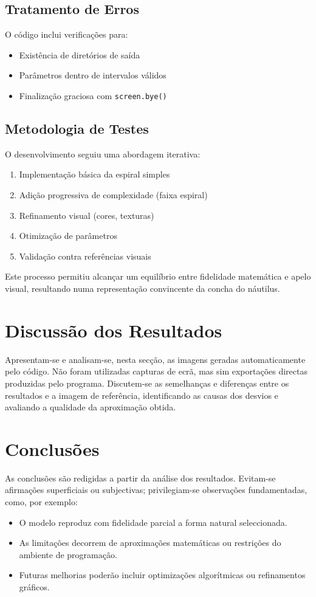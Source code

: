 \documentclass[12pt,a4paper,oneside]{extarticle}
\begin{document}
\subsection{Tratamento de Erros}
O código inclui verificações para:

\begin{itemize}
    \item Existência de diretórios de saída
    \item Parâmetros dentro de intervalos válidos
    \item Finalização graciosa com \texttt{screen.bye()}
\end{itemize}

\subsection{Metodologia de Testes}
O desenvolvimento seguiu uma abordagem iterativa:

\begin{enumerate}
    \item Implementação básica da espiral simples
    \item Adição progressiva de complexidade (faixa espiral)
    \item Refinamento visual (cores, texturas)
    \item Otimização de parâmetros
    \item Validação contra referências visuais
\end{enumerate}

Este processo permitiu alcançar um equilíbrio entre fidelidade matemática e apelo visual, resultando numa representação convincente da concha do náutilus.






\section{Discussão dos Resultados}
Apresentam-se e analisam-se, nesta secção, as imagens geradas automaticamente pelo código.  
Não foram utilizadas capturas de ecrã, mas sim exportações directas produzidas pelo programa.  
Discutem-se as semelhanças e diferenças entre os resultados e a imagem de referência, identificando as causas dos desvios e avaliando a qualidade da aproximação obtida.  

\section{Conclusões}
As conclusões são redigidas a partir da análise dos resultados.  
Evitam-se afirmações superficiais ou subjectivas; privilegiam-se observações fundamentadas, como, por exemplo:  
\begin{itemize}
    \item O modelo reproduz com fidelidade parcial a forma natural seleccionada.  
    \item As limitações decorrem de aproximações matemáticas ou restrições do ambiente de programação.  
    \item Futuras melhorias poderão incluir optimizações algorítmicas ou refinamentos gráficos.  
\end{itemize}
\end{document}
